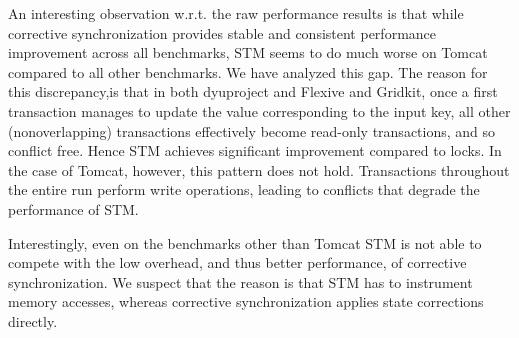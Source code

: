 %
An interesting observation w.r.t. the raw performance results is that while corrective synchronization provides stable and consistent performance improvement across all benchmarks, STM seems to do much worse on Tomcat compared to all other benchmarks. We have analyzed this gap.
%
The reason for this discrepancy,is that in both dyuproject and Flexive and Gridkit, once a first transaction manages to update the value corresponding to the input key, all other (nonoverlapping) transactions effectively become read-only transactions, and so conflict free. Hence STM achieves significant improvement compared to locks. In the case of Tomcat, however, this pattern does not hold. Transactions throughout the entire run perform write operations, leading to conflicts that degrade the performance of STM.

Interestingly, even on the benchmarks other than Tomcat STM is not able to compete with the low overhead, and thus better performance, of corrective synchronization. We suspect that the reason is that STM has to instrument memory accesses, whereas corrective synchronization applies state corrections directly.

\vfill
